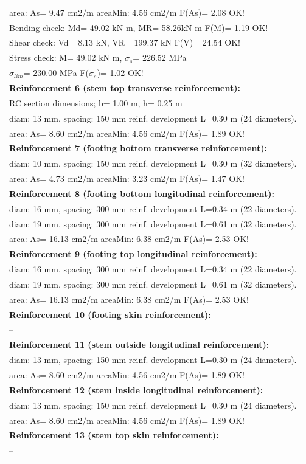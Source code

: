 \begin{center}
\begin{supertabular}[H]{|l|}
  area: As=   9.47 cm2/m areaMin:   4.56 cm2/m  F(As)= 2.08 OK!\\
  Bending check: Md=  49.02 kN m, MR=  58.26kN m  F(M)= 1.19 OK!\\
  Shear check: Vd=   8.13 kN,  VR= 199.37 kN  F(V)= 24.54 OK!\\
  Stress check: M=  49.02 kN m, $\sigma_s$= 226.52 MPa\\
    $\sigma_{lim}$= 230.00 MPa  F($\sigma_s$)= 1.02 OK!\\
\textbf{Reinforcement 6 (stem top transverse reinforcement):}\\
  RC section dimensions; b= 1.00 m, h= 0.25 m\\
  diam: 13 mm, spacing: 150 mm  reinf. development L=0.30 m (24 diameters).\\
  area: As=   8.60 cm2/m areaMin:   4.56 cm2/m  F(As)= 1.89 OK!\\
\textbf{Reinforcement 7 (footing bottom transverse reinforcement):}\\
  diam: 10 mm, spacing: 150 mm  reinf. development L=0.30 m (32 diameters).\\
  area: As=   4.73 cm2/m areaMin:   3.23 cm2/m  F(As)= 1.47 OK!\\
\textbf{Reinforcement 8 (footing bottom longitudinal reinforcement):}\\
  diam: 16 mm, spacing: 300 mm  reinf. development L=0.34 m (22 diameters).\\
  diam: 19 mm, spacing: 300 mm  reinf. development L=0.61 m (32 diameters).\\
  area: As=  16.13 cm2/m areaMin:   6.38 cm2/m  F(As)= 2.53 OK!\\
\textbf{Reinforcement 9 (footing top longitudinal reinforcement):}\\
  diam: 16 mm, spacing: 300 mm  reinf. development L=0.34 m (22 diameters).\\
  diam: 19 mm, spacing: 300 mm  reinf. development L=0.61 m (32 diameters).\\
  area: As=  16.13 cm2/m areaMin:   6.38 cm2/m  F(As)= 2.53 OK!\\
\textbf{Reinforcement 10 (footing skin reinforcement):}\\
  --\\
\textbf{Reinforcement 11 (stem outside longitudinal reinforcement):}\\
  diam: 13 mm, spacing: 150 mm  reinf. development L=0.30 m (24 diameters).\\
  area: As=   8.60 cm2/m areaMin:   4.56 cm2/m  F(As)= 1.89 OK!\\
\textbf{Reinforcement 12 (stem inside longitudinal reinforcement):}\\
  diam: 13 mm, spacing: 150 mm  reinf. development L=0.30 m (24 diameters).\\
  area: As=   8.60 cm2/m areaMin:   4.56 cm2/m  F(As)= 1.89 OK!\\
\textbf{Reinforcement 13 (stem top skin reinforcement):}\\
  --\\
\hline
\end{supertabular}
\end{center}
